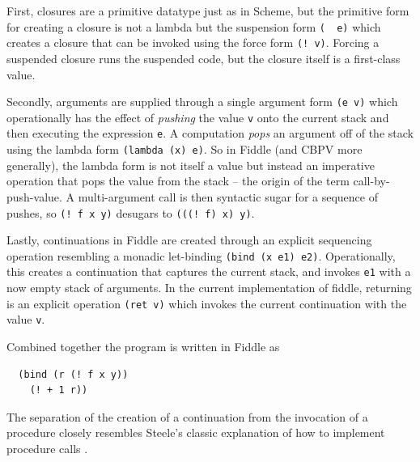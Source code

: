 \documentclass[acmsmall,screen,review,anonymous]{acmart}
\begin{document}
First, closures are a primitive datatype just as in Scheme, but the primitive form for creating a closure is not a lambda but the suspension form \texttt{(~ e)} which creates a closure that can be invoked using the force form \texttt{(! v)}. Forcing a suspended closure runs the suspended code, but the closure itself is a first-class value.

Secondly, arguments are supplied through a single argument form \texttt{(e v)} which operationally has the effect of \emph{pushing} the value \texttt{v} onto the current stack and then executing the expression \texttt{e}. A computation \emph{pops} an argument off of the stack using the lambda form \texttt{(lambda (x) e)}. So in Fiddle (and CBPV more generally), the lambda form is not itself a value but instead an imperative operation that pops the value from the stack -- the origin of the term call-by-push-value. A multi-argument call is then syntactic sugar for a sequence of pushes, so \texttt{(! f x y)} desugars to \texttt{(((! f) x) y)}.

Lastly, continuations in Fiddle are created through an explicit
sequencing operation resembling a monadic let-binding
\texttt{(bind (x e1) e2)}. Operationally, this creates a
continuation that captures the current stack, and invokes
\texttt{e1} with a now empty stack of arguments. In the
current implementation of fiddle, returning is an explicit operation
\texttt{(ret v)} which invokes the current continuation
with the value \texttt{v}.

Combined together the program is written in Fiddle as
\begin{verbatim}
  (bind (r (! f x y))
    (! + 1 r))
\end{verbatim}
The separation of the creation of a continuation from the invocation
of a procedure closely resembles Steele's classic explanation of how to implement procedure calls \cite{steele-goto}.

\end{document}
